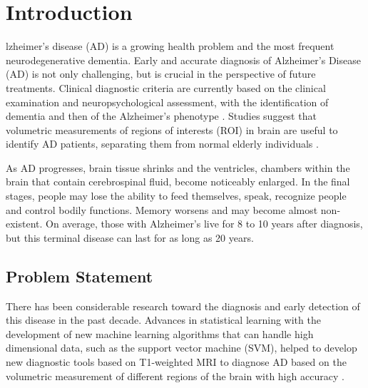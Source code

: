 


\section{Introduction}

lzheimer's disease (AD) is a growing health problem and the most frequent neurodegenerative dementia. Early and accurate diagnosis of Alzheimer's Disease (AD) is not only challenging, but is crucial in the perspective of future treatments. Clinical diagnostic criteria are currently based on the clinical examination and neuropsychological assessment, with the identification of dementia and then of the Alzheimer's phenotype \cite{glodzik2012alzheimer}. Studies suggest that volumetric measurements of regions of interests (ROI) in brain are useful to identify AD patients, separating them from normal elderly individuals \cite{bottino2002volumetric}. 

As AD progresses, brain tissue shrinks and the ventricles, chambers within the brain that contain cerebrospinal fluid, become noticeably enlarged. In the final stages, people may lose the ability to feed themselves, speak, recognize people and control bodily functions. Memory worsens and may become almost non-existent. On average, those with Alzheimer's live for 8 to 10 years after diagnosis, but this terminal disease can last for as long as 20 years.

\subsection{Problem Statement}
There has been considerable research toward the diagnosis and early detection of this disease in the past decade. Advances in statistical learning with the development of new machine learning algorithms that can handle high dimensional data, such as the support vector machine (SVM), helped to develop new diagnostic tools based on T1-weighted MRI to diagnose AD based on the volumetric measurement of different regions of the brain with high accuracy \cite{cuingnet2011automatic}.

